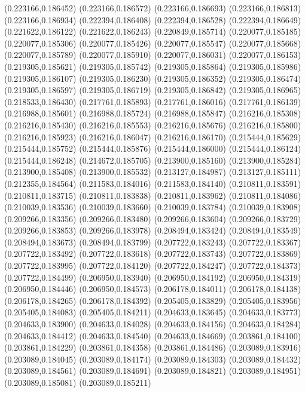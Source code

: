 (0.223166,0.186452)
(0.223166,0.186572)
(0.223166,0.186693)
(0.223166,0.186813)
(0.223166,0.186934)
(0.222394,0.186408)
(0.222394,0.186528)
(0.222394,0.186649)
(0.221622,0.186122)
(0.221622,0.186243)
(0.220849,0.185714)
(0.220077,0.185185)
(0.220077,0.185306)
(0.220077,0.185426)
(0.220077,0.185547)
(0.220077,0.185668)
(0.220077,0.185789)
(0.220077,0.185910)
(0.220077,0.186031)
(0.220077,0.186153)
(0.219305,0.185621)
(0.219305,0.185742)
(0.219305,0.185864)
(0.219305,0.185986)
(0.219305,0.186107)
(0.219305,0.186230)
(0.219305,0.186352)
(0.219305,0.186474)
(0.219305,0.186597)
(0.219305,0.186719)
(0.219305,0.186842)
(0.219305,0.186965)
(0.218533,0.186430)
(0.217761,0.185893)
(0.217761,0.186016)
(0.217761,0.186139)
(0.216988,0.185601)
(0.216988,0.185724)
(0.216988,0.185847)
(0.216216,0.185308)
(0.216216,0.185430)
(0.216216,0.185553)
(0.216216,0.185676)
(0.216216,0.185800)
(0.216216,0.185923)
(0.216216,0.186047)
(0.216216,0.186170)
(0.215444,0.185629)
(0.215444,0.185752)
(0.215444,0.185876)
(0.215444,0.186000)
(0.215444,0.186124)
(0.215444,0.186248)
(0.214672,0.185705)
(0.213900,0.185160)
(0.213900,0.185284)
(0.213900,0.185408)
(0.213900,0.185532)
(0.213127,0.184987)
(0.213127,0.185111)
(0.212355,0.184564)
(0.211583,0.184016)
(0.211583,0.184140)
(0.210811,0.183591)
(0.210811,0.183715)
(0.210811,0.183838)
(0.210811,0.183962)
(0.210811,0.184086)
(0.210039,0.183536)
(0.210039,0.183660)
(0.210039,0.183784)
(0.210039,0.183908)
(0.209266,0.183356)
(0.209266,0.183480)
(0.209266,0.183604)
(0.209266,0.183729)
(0.209266,0.183853)
(0.209266,0.183978)
(0.208494,0.183424)
(0.208494,0.183549)
(0.208494,0.183673)
(0.208494,0.183799)
(0.207722,0.183243)
(0.207722,0.183367)
(0.207722,0.183492)
(0.207722,0.183618)
(0.207722,0.183743)
(0.207722,0.183869)
(0.207722,0.183995)
(0.207722,0.184120)
(0.207722,0.184247)
(0.207722,0.184373)
(0.207722,0.184499)
(0.206950,0.183940)
(0.206950,0.184192)
(0.206950,0.184319)
(0.206950,0.184446)
(0.206950,0.184573)
(0.206178,0.184011)
(0.206178,0.184138)
(0.206178,0.184265)
(0.206178,0.184392)
(0.205405,0.183829)
(0.205405,0.183956)
(0.205405,0.184083)
(0.205405,0.184211)
(0.204633,0.183645)
(0.204633,0.183773)
(0.204633,0.183900)
(0.204633,0.184028)
(0.204633,0.184156)
(0.204633,0.184284)
(0.204633,0.184412)
(0.204633,0.184540)
(0.204633,0.184669)
(0.203861,0.184100)
(0.203861,0.184229)
(0.203861,0.184358)
(0.203861,0.184486)
(0.203089,0.183916)
(0.203089,0.184045)
(0.203089,0.184174)
(0.203089,0.184303)
(0.203089,0.184432)
(0.203089,0.184561)
(0.203089,0.184691)
(0.203089,0.184821)
(0.203089,0.184951)
(0.203089,0.185081)
(0.203089,0.185211)
